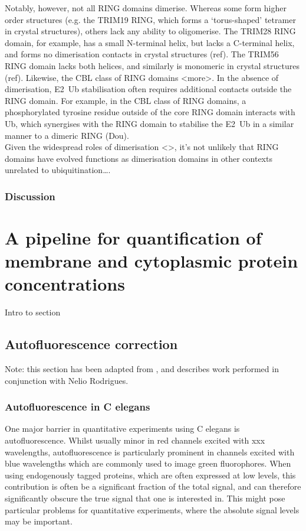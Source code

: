 \documentclass[12pt]{"article"}
\begin{document}
Notably, however, not all RING domains dimerise. Whereas some form higher order structures (e.g. the TRIM19 RING, which forms a ‘torus-shaped’ tetramer in crystal structures), others lack any ability to oligomerise. The TRIM28 RING domain, for example, has a small N-terminal helix, but lacks a C-terminal helix, and forms no dimerisation contacts in crystal structures (ref). The TRIM56 RING domain lacks both helices, and similarly is monomeric in crystal structures (ref). Likewise, the CBL class of RING domains <more>. In the absence of dimerisation, E2~Ub stabilisation often requires additional contacts outside the RING domain. For example, in the CBL class of RING domains, a phosphorylated tyrosine residue outside of the core RING domain interacts with Ub, which synergises with the RING domain to stabilise the E2~Ub in a similar manner to a dimeric RING (Dou).\\

Given the widespread roles of dimerisation <>, it’s not unlikely that RING domains have evolved functions as dimerisation domains in other contexts unrelated to ubiquitination….\\


\subsubsection{Discussion}

\clearpage
\section{A pipeline for quantification of membrane and cytoplasmic protein concentrations}

Intro to section

\subsection{Autofluorescence correction}

Note: this section has been adapted from \textcite{Rodrigues2022}, and describes work performed in conjunction with Nelio Rodrigues.

\subsubsection{Autofluorescence in C elegans}

One major barrier in quantitative experiments using C elegans is autofluorescence. Whilst usually minor in red channels excited with xxx wavelengths, autofluorescence is particularly prominent in channels excited with blue wavelengths which are commonly used to image green fluorophores. When using endogenously tagged proteins, which are often expressed at low levels, this contribution is often be a significant fraction of the total signal, and can therefore significantly obscure the true signal that one is interested in. This might pose particular problems for quantitative experiments, where the absolute signal levels may be important.\\
\end{document}

